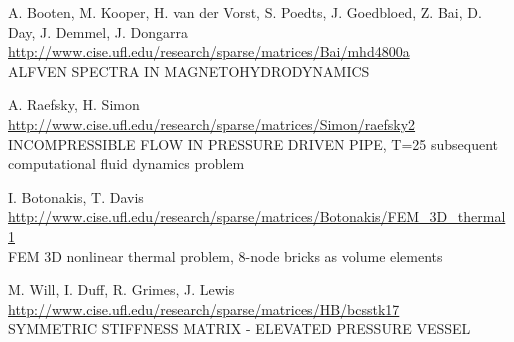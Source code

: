 	{
	}

	{
		{
			A. Booten, M. Kooper, H. van der Vorst, S. Poedts, J. Goedbloed, Z. Bai, D. Day, J. Demmel, J. Dongarra 
		}
		{
			\url{http://www.cise.ufl.edu/research/sparse/matrices/Bai/mhd4800a} \\
			ALFVEN SPECTRA IN MAGNETOHYDRODYNAMICS
		}
	}

	{
		{
			 A. Raefsky, H. Simon 
		}
		{
			\url{http://www.cise.ufl.edu/research/sparse/matrices/Simon/raefsky2} \\
			INCOMPRESSIBLE FLOW IN PRESSURE DRIVEN PIPE, T=25
			subsequent computational fluid dynamics problem 
		}
	}

	{
		{
			I. Botonakis, T. Davis 
		}
		{
			\url{http://www.cise.ufl.edu/research/sparse/matrices/Botonakis/FEM_3D_thermal1} \\
			FEM 3D nonlinear thermal problem, 8-node bricks as volume elements
		}
	}
	
	{
		{
			 M. Will, I. Duff, R. Grimes, J. Lewis 
		}
		{
			\url{http://www.cise.ufl.edu/research/sparse/matrices/HB/bcsstk17} \\
			SYMMETRIC STIFFNESS MATRIX - ELEVATED PRESSURE VESSEL
		}
	}

